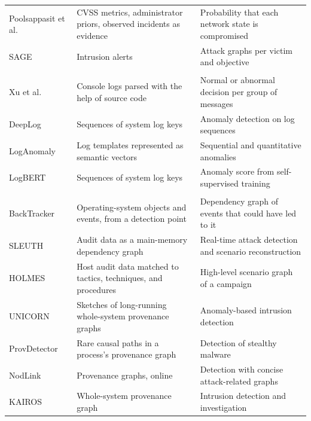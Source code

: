 {\begin{xltabular}{\textwidth}{@{}>{\raggedright\arraybackslash}p{0.22\textwidth}>{\raggedright\arraybackslash}X>{\raggedright\arraybackslash}X@{}}
Poolsappasit et al.~\cite{poolsappasit2012dynamic}
 & CVSS metrics, administrator priors, observed incidents as evidence
 & Probability that each network state is compromised \\
SAGE~\cite{nadeem2022alert}
 & Intrusion alerts
 & Attack graphs per victim and objective \\
\midrule
{} \\
Xu et al.~\cite{xu2009detecting}
 & Console logs parsed with the help of source code
 & Normal or abnormal decision per group of messages \\
DeepLog~\cite{du2017deeplog}
 & Sequences of system log keys
  & Anomaly detection on log sequences \\
LogAnomaly~\cite{meng2019loganomaly}
 & Log templates represented as semantic vectors
 & Sequential and quantitative anomalies \\
LogBERT~\cite{guo2021logbert}
 & Sequences of system log keys
 & Anomaly score from self-supervised training \\
\midrule
{} \\
BackTracker~\cite{king2003backtracking}
 & Operating-system objects and events, from a detection point
 & Dependency graph of events that could have led to it \\
SLEUTH~\cite{hossain2017sleuth}
 & Audit data as a main-memory dependency graph
 & Real-time attack detection and scenario reconstruction \\
HOLMES~\cite{milajerdi2019holmes}
 & Host audit data matched to tactics, techniques, and procedures
 & High-level scenario graph of a campaign \\
UNICORN~\cite{han2020unicorn}
 & Sketches of long-running whole-system provenance graphs
 & Anomaly-based intrusion detection \\
ProvDetector~\cite{wang2020you}
 & Rare causal paths in a process's provenance graph
 & Detection of stealthy malware \\
NodLink~\cite{li2024nodlink}
 & Provenance graphs, online
 & Detection with concise attack-related graphs \\
KAIROS~\cite{cheng2024kairos}
 & Whole-system provenance graph
  & Intrusion detection and investigation \\

\end{xltabular}}
